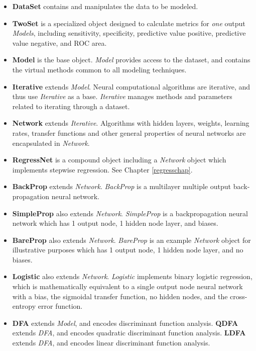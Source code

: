 \documentclass{report}
\begin{document}
\begin{itemize}
\item {\bf DataSet} contains and manipulates the data to be modeled.
\item {\bf TwoSet} is a specialized object designed to calculate
      metrics for {\em one} output {\em Models}, including
      sensitivity, specificity, predictive value positive, predictive
      value negative, and ROC area.
\item {\bf Model} is the base object. {\em Model} provides access to
      the dataset, and contains the virtual methods common to all
      modeling techniques.
\item {\bf Iterative} extends {\em Model}.  Neural computational
      algorithms are iterative, and thus use {\em Iterative} as a
      base.  {\em Iterative} manages methods and parameters related to
      iterating through a dataset.
\item {\bf Network} extends {\em Iterative}.  Algorithms with hidden
      layers, weights, learning rates, transfer functions and other
      general properties of neural networks are encapsulated in {\em
      Network}.
\item {\bf RegressNet} is a compound object including a {\em Network}
      object which implements stepwise regression.  See Chapter
      \ref{regresschap}.
\item {\bf BackProp} extends {\em Network}.  {\em BackProp} is a
      multilayer multiple output back-propagation neural network.
\item {\bf SimpleProp} also extends {\em Network}.  {\em SimpleProp}
      is a backpropagation neural network which has 1 output node, 1
      hidden node layer, and biases.
\item {\bf BareProp} also extends {\em Network}.  {\em BareProp} is an
      example {\em Network} object for illustrative purposes which has
      1 output node, 1 hidden node layer, and no biases.
\item {\bf Logistic} also extends {\em Network}.  {\em Logistic}
      implements binary logistic regression, which is mathematically
      equivalent to a single output node neural network with a bias,
      the sigmoidal transfer function, no hidden nodes, and the
      cross-entropy error function.
\item {\bf DFA} extends {\em Model}, and encodes discriminant function
      analysis.  {\bf QDFA} extends {\em DFA}, and encodes quadratic
      discriminant function analysis.  {\bf LDFA} extends {\em DFA},
      and encodes linear discriminant function analysis.
\end{itemize}
\end{document}
